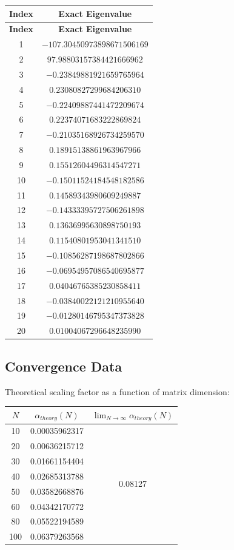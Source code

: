 \documentclass[12pt,letterpaper]{article}
\theoremstyle{plain}
\theoremstyle{definition}
\theoremstyle{remark}
\begin{document}
\begin{longtable}{|c|c|}
\hline
\textbf{Index} & \textbf{Exact Eigenvalue} \\
\hline
\endfirsthead
\hline
\textbf{Index} & \textbf{Exact Eigenvalue} \\
\hline
\endhead
1 & $-107.30450973898671506169$ \\
2 & $97.98803157384421666962$ \\
3 & $-0.23849881921659765964$ \\
4 & $0.23080827299684206310$ \\
5 & $-0.22409887441472209674$ \\
6 & $0.22374071683222869824$ \\
7 & $-0.21035168926734259570$ \\
8 & $0.18915138861963967966$ \\
9 & $0.15512604496314547271$ \\
10 & $-0.15011524184548182586$ \\
11 & $0.14589343980609249887$ \\
12 & $-0.14333395727506261898$ \\
13 & $0.13636995630898750193$ \\
14 & $0.11540801953041341510$ \\
15 & $-0.10856287198687802866$ \\
16 & $-0.06954957086540695877$ \\
17 & $0.04046765385230858411$ \\
18 & $-0.03840022121210955640$ \\
19 & $-0.01280146795347373828$ \\
20 & $0.01004067296648235990$ \\
\hline
\end{longtable}
\pagebreak

\subsection{Convergence Data}

Theoretical scaling factor as a function of matrix dimension:

\begin{longtable}{|c|c|c|}
\hline
$N$ & $\alpha_{theory}(N)$ & $\lim_{N \to \infty} \alpha_{theory}(N)$ \\
\hline
10 & 0.00035962317 & \multirow{8}{*}{0.08127} \\
20 & 0.00636215712 & \\
30 & 0.01661154404 & \\
40 & 0.02685313788 & \\
50 & 0.03582668876 & \\
60 & 0.04342170772 & \\
80 & 0.05522194589 & \\
100 & 0.06379263568 & \\
\hline
\end{longtable}
\end{document}

